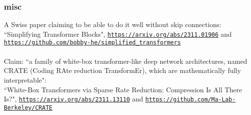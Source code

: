 \documentclass{beamer}
\begin{document}
\begin{frame}

  \frametitle{misc}

A Swiss paper claiming to be able to do it well without skip connections:\\[2ex]

``Simplifying Transformer Blocks", \href{https://arxiv.org/abs/2311.01906}{\tt\small https://arxiv.org/abs/2311.01906}
and \href{https://github.com/bobby-he/simplified\_transformers}{\tt\small https://github.com/bobby-he/simplified\_transformers}\\

\hrulefill\\[1ex]

Claim: ``a family of white-box transformer-like deep network architectures, named CRATE (Coding RAte reduction TransformEr), which are mathematically fully interpretable":\\[2ex]

``White-Box Transformers via Sparse Rate Reduction: Compression Is All There Is?",
\href{https://arxiv.org/abs/2311.13110}{\tt\small https://arxiv.org/abs/2311.13110} and
\href{https://github.com/Ma-Lab-Berkeley/CRATE}{\tt\small https://github.com/Ma-Lab-Berkeley/CRATE}

\end{frame}
\end{document}
